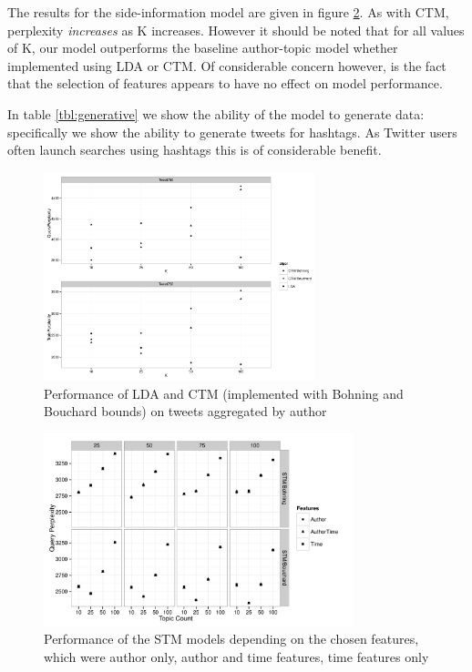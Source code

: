 The results for the side-information model are given in figure \ref{fig:stm-p-all}. As with CTM, perplexity \emph{increases} as K increases. However it should be noted that for all values of K, our model outperforms the baseline author-topic model whether implemented using LDA or CTM. Of considerable concern however, is the fact that the selection of features appears to have no effect on model performance.

In table \ref{tbl:generative} we show the ability of the model to generate data: specifically we show the ability to generate tweets for hashtags. As Twitter users often launch searches using hashtags this is of considerable benefit.


\begin{figure}
\centering
    \includegraphics[width=0.7\textwidth]{plots/TweetCtmLda.pdf}
    \caption{Performance of LDA and CTM (implemented with Bohning and Bouchard bounds) on tweets aggregated by author}
    \label{fig:tweet-ctm-lda}
\end{figure}

\begin{figure}
\centering
    \includegraphics[width=0.8\textwidth]{plots/TweetStmQueryFeatures.pdf}
    \caption{Performance of the STM models depending on the chosen features, which were author only, author and time features, time features only}
    \label{fig:stm-p-all}
\end{figure}

